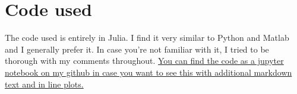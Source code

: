 \documentclass[12pt]{article}
\theoremstyle{definition}
\theoremstyle{remark}
\begin{document}
\newpage
\section*{Code used}%
\label{sec:code_used}

The code used is entirely in Julia. I find it very similar to Python and Matlab and I generally prefer it. In case you're not familiar with it, I tried to be thorough with my comments throughout. \href{https://github.com/marlinfiggins/UW-AMATH-notes/blob/master/AMATH-584A-Applied-Linear-Algebra/notebooks/HW-2-Code.ipynb}{You can find the code as a jupyter notebook on my github in case you want to see this with additional markdown text and in line plots.}
\inputminted{julia}{HW-2-Code-Figgins.jl}
\end{document}
